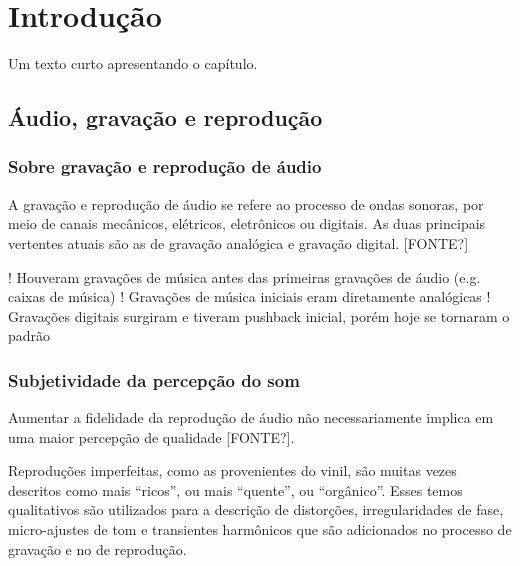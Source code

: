 
\chapter{Introdução}\label{cap:introducao}

Um texto curto apresentando o capítulo.

\section{Áudio, gravação e reprodução}\label{sec:audioGravacaoReproducao}
\subsection{Sobre gravação e reprodução de áudio}\label{subsec:gravacaoReproducaoAudio}

A gravação e reprodução de áudio se refere ao processo de ondas sonoras, por meio de canais mecânicos, elétricos, eletrônicos ou digitais. As duas principais vertentes atuais são as de gravação analógica e gravação digital. [FONTE?]

! Houveram gravações de música antes das primeiras gravações de áudio (e.g. caixas de música)
! Gravações de música iniciais eram diretamente analógicas
! Gravações digitais surgiram e tiveram pushback inicial, porém hoje se tornaram o padrão


\subsection{Subjetividade da percepção do som}\label{subsec:subjetividadeSom}

Aumentar a fidelidade da reprodução de áudio não necessariamente implica em uma maior percepção de qualidade [FONTE?]. 

Reproduções imperfeitas, como as provenientes do vinil, são muitas vezes descritos como mais “ricos”, ou mais “quente”, ou “orgânico”. Esses temos qualitativos são utilizados para a descrição de distorções, irregularidades de fase, micro-ajustes de tom e transientes harmônicos que são adicionados no processo de gravação e no de reprodução. 

